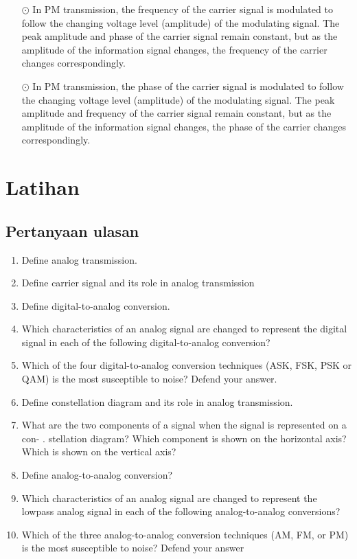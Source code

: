 \begin{itemize}
  \item[$\odot$] In PM transmission, the frequency of the carrier signal is modulated to follow the changing voltage level (amplitude) of the modulating signal. The peak amplitude and phase of the carrier signal remain constant, but as the amplitude of the information signal changes, the frequency of the carrier changes correspondingly.
  \item[$\odot$] In PM transmission, the phase of the carrier signal is modulated to follow the changing voltage level (amplitude) of the modulating signal. The peak amplitude and frequency of the carrier signal remain constant, but as the amplitude of the information signal changes, the phase of the carrier changes correspondingly.
\end{itemize}

\section{Latihan}

\subsection*{Pertanyaan ulasan}

\begin{enumerate}
  \item Define analog transmission.
  \item Define carrier signal and its role in analog transmission
  \item Define digital-to-analog conversion.
  \item Which characteristics of an analog signal are changed to represent the digital signal in each of the following digital-to-analog conversion?
  \item Which of the four digital-to-analog conversion techniques (ASK, FSK, PSK or QAM) is the most susceptible to noise? Defend your answer.
  \item Define constellation diagram and its role in analog transmission.
  \item What are the two components of a signal when the signal is represented on a con- . stellation diagram? Which component is shown on the horizontal axis? Which is shown on the vertical axis?
  \item Define analog-to-analog conversion?
  \item Which characteristics of an analog signal are changed to represent the lowpass analog signal in each of the following analog-to-analog conversions?
  \item Which of the three analog-to-analog conversion techniques (AM, FM, or PM) is the most susceptible to noise? Defend your answer
\end{enumerate}

